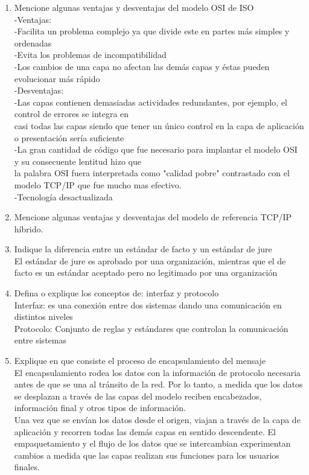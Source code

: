 \documentclass{udparticle}
\begin{document}
\begin{enumerate}
\item Mencione algunas ventajas y desventajas del modelo OSI de ISO\\
    -Ventajas:\\
        -Facilita un problema complejo ya que divide este en partes más simples y ordenadas\\
        -Evita los problemas de incompatibilidad\\
        -Los cambios de una capa no afectan las demás capas y éstas pueden evolucionar más rápido\\
    -Desventajas:\\
        -Las capas contienen demasiadas actividades redundantes, por ejemplo, el control de errores se integra en \\
         casi todas las capas siendo que tener un único control en la capa de aplicación o presentación sería suficiente\\
        -La gran cantidad de código que fue necesario para implantar el modelo OSI y su consecuente lentitud hizo que \\
         la palabra OSI fuera interpretada como "calidad pobre" contrastado con el modelo TCP/IP que fue mucho mas efectivo.\\
        -Tecnología desactualizada\\
        
\item Mencione algunas ventajas y desventajas del modelo de referencia TCP/IP híbrido.\\

\item Indique la diferencia entre un estándar de  facto y un estándar de  jure\\
    El estándar de jure es aprobado por una organización, mientras que el de facto es un estándar aceptado pero 
    no legitimado por una organización\\
\item Defina o explique los conceptos de: interfaz y protocolo\\
    Interfaz: es una conexión entre dos sistemas dando una comunicación en distintos niveles\\
    Protocolo: Conjunto de reglas y estándares que controlan la comunicación entre sistemas\\
\item Explique en que consiste el proceso de encapsulamiento del mensaje\\
    El encapsulamiento rodea los datos con la información de protocolo necesaria antes de que se una al tránsito de la red.
    Por lo tanto, a medida que los datos se desplazan a través de las capas del modelo reciben encabezados, información final y otros
    tipos de información.\\
    Una vez que se envían los datos desde el origen, viajan a través de la capa de aplicación y recorren todas las demás capas en 
    sentido descendente. El empaquetamiento y el flujo de los datos que se intercambian experimentan cambios a medida que las capas 
    realizan sus funciones para los usuarios finales.\\


\end{enumerate}
\end{document}
